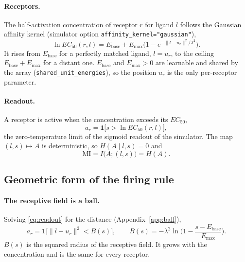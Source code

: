 \documentclass[11pt,a4paper]{article}
\newcommand{\Ebase}{E_{\mathrm{base}}}
\newcommand{\Emax}{E_{\mathrm{max}}}
\newcommand{\one}{\mathbf{1}}
\begin{document}
\paragraph{Receptors.} The half-activation concentration of receptor $r$ for ligand $l$
follows the Gaussian affinity kernel (simulator option \texttt{affinity\_kernel="gaussian"}),
\begin{equation}
  \ln EC_{50}(r,l)=\Ebase+\Emax\Big(1-e^{-\|l-u_r\|^2/\lambda^2}\Big).
  \label{eq:kernel}
\end{equation}
It rises from $\Ebase$ for a perfectly matched ligand, $l=u_r$, to the ceiling
$\Ebase+\Emax$ for a distant one. $\Ebase$ and $\Emax>0$ are learnable and shared by the
array (\texttt{shared\_unit\_energies}), so the position $u_r$ is the only per-receptor
parameter.

\paragraph{Readout.} A receptor is active when the concentration exceeds its $EC_{50}$,
\begin{equation}
  a_r=\one\big[s>\ln EC_{50}(r,l)\big],
  \label{eq:readout}
\end{equation}
the zero-temperature limit of the sigmoid readout of the simulator. The map
$(l,s)\mapsto A$ is deterministic, so $H(A\mid l,s)=0$ and
\begin{equation}
  \mathrm{MI}=I\big(A;(l,s)\big)=H(A).
  \label{eq:MI}
\end{equation}

\subsection{Geometric form of the firing rule}

\paragraph{The receptive field is a ball.} Solving \eqref{eq:readout} for the distance
(Appendix~\ref{app:ball}),
\begin{equation}
  a_r=\one\big[\|l-u_r\|^2<B(s)\big],
  \qquad
  B(s)=-\lambda^2\ln\Big(1-\frac{s-\Ebase}{\Emax}\Big).
  \label{eq:ball}
\end{equation}
$B(s)$ is the squared radius of the receptive field. It grows with the concentration and
is the same for every receptor.
\end{document}
